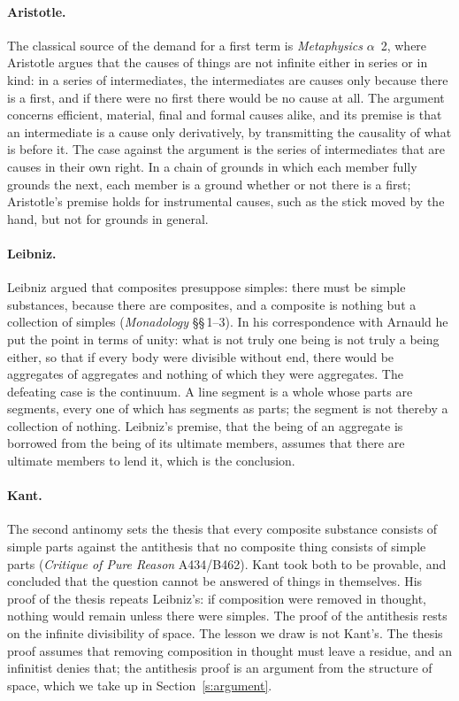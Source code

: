 \documentclass{situationist-preprint}
\begin{document}
\paragraph{Aristotle.} The classical source of the demand for a first term is \emph{Metaphysics} $\alpha$~2, where Aristotle argues that the causes of things are not infinite either in series or in kind: in a series of intermediates, the intermediates are causes only because there is a first, and if there were no first there would be no cause at all. The argument concerns efficient, material, final and formal causes alike, and its premise is that an intermediate is a cause only derivatively, by transmitting the causality of what is before it. The case against the argument is the series of intermediates that are causes in their own right. In a chain of grounds in which each member fully grounds the next, each member is a ground whether or not there is a first; Aristotle's premise holds for instrumental causes, such as the stick moved by the hand, but not for grounds in general.

\paragraph{Leibniz.} Leibniz argued that composites presuppose simples: there must be simple substances, because there are composites, and a composite is nothing but a collection of simples (\emph{Monadology} \S\S\,1--3). In his correspondence with Arnauld he put the point in terms of unity: what is not truly one being is not truly a being either, so that if every body were divisible without end, there would be aggregates of aggregates and nothing of which they were aggregates. The defeating case is the continuum. A line segment is a whole whose parts are segments, every one of which has segments as parts; the segment is not thereby a collection of nothing. Leibniz's premise, that the being of an aggregate is borrowed from the being of its ultimate members, assumes that there are ultimate members to lend it, which is the conclusion.

\paragraph{Kant.} The second antinomy sets the thesis that every composite substance consists of simple parts against the antithesis that no composite thing consists of simple parts (\emph{Critique of Pure Reason} A434/B462). Kant took both to be provable, and concluded that the question cannot be answered of things in themselves. His proof of the thesis repeats Leibniz's: if composition were removed in thought, nothing would remain unless there were simples. The proof of the antithesis rests on the infinite divisibility of space. The lesson we draw is not Kant's. The thesis proof assumes that removing composition in thought must leave a residue, and an infinitist denies that; the antithesis proof is an argument from the structure of space, which we take up in Section~\ref{s:argument}.
\end{document}
